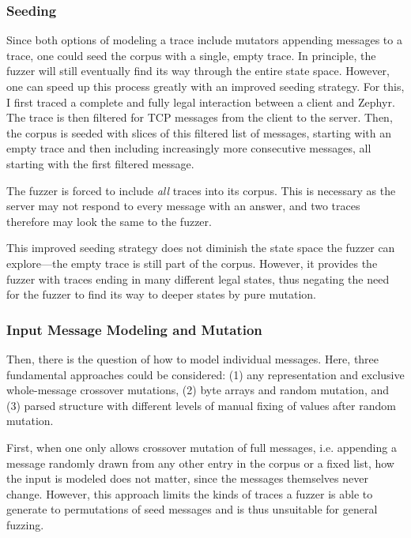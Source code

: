 \documentclass[twocolumn]{article}
\begin{document}
\subsubsection{Seeding}
\label{Implementation:Seeding}

Since both options of modeling a trace include mutators appending messages to a trace, one could seed the corpus with a single, empty trace. In principle, the fuzzer will still eventually find its way through the entire state space. However, one can speed up this process greatly with an improved seeding strategy. For this, I first traced a complete and fully legal interaction between a client and Zephyr. The trace is then filtered for TCP messages from the client to the server. Then, the corpus is seeded with slices of this filtered list of messages, starting with an empty trace and then including increasingly more consecutive messages, all starting with the first filtered message.

The fuzzer is forced to include \textit{all} traces into its corpus. This is necessary as the server may not respond to every message with an answer, and two traces therefore may look the same to the fuzzer.

This improved seeding strategy does not diminish the state space the fuzzer can explore—the empty trace is still part of the corpus. However, it provides the fuzzer with traces ending in many different legal states, thus negating the need for the fuzzer to find its way to deeper states by pure mutation.

\subsubsection{Input Message Modeling and Mutation}
\label{Implementation:InputModeling:MessageModeling}
Then, there is the question of how to model individual messages. Here, three fundamental approaches could be considered: (1) any representation and exclusive whole-message crossover mutations, (2) byte arrays and random mutation, and (3) parsed structure with different levels of manual fixing of values after random mutation.

First, when one only allows crossover mutation of full messages, i.e. appending a message randomly drawn from any other entry in the corpus or a fixed list, how the input is modeled does not matter, since the messages themselves never change. However, this approach limits the kinds of traces a fuzzer is able to generate to permutations of seed messages and is thus unsuitable for general fuzzing.
\end{document}
